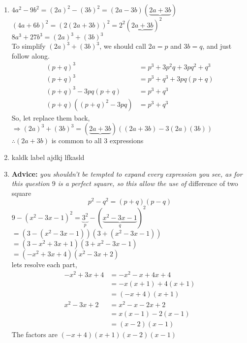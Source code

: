 \begin{multicols}{2}
\begin{enumerate}[label={\textbf{\arabic*.}}]
    \item 
        $4a^2 - 9b^2 = (2a)^2 - (3b)^2  = (2a - 3b)(\underbrace{2a+3b})$ \\
        $(4a + 6b)^2  = \left(2(2a + 3b)\right)^2 = 2^2 (\underbrace{2a + 3b})^2$ \\
        $8a^3 + 27b^3  = (2a)^3 + (3b)^3$ \\
        To simplify $(2a)^3 + (3b)^3$, we should call $2a = p $
        and $3b = q$, and just follow along. 
        \begin{align*} 
            (p + q)^3 &= p^3 + 3p^2q + 3pq^2 + q^3 \\
            (p + q)^3 &= p^3 + q^3 + 3pq(p + q)  \\
            (p + q)^3 - 3pq(p + q) & = p^3 + q^3 \\
            (p+q)((p+q)^2 - 3pq) &= p^3 + q^3
        \end{align*}
        So, let replace them back, \\
        $ \Rightarrow (2a)^3 + (3b)^3 =(\underbrace{2a + 3b})\left((2a + 3b) - 3(2a)(3b)\right) $ \\
        $\therefore (2a + 3b)$ is common to all 3 expressions
    \item kaldk label
    ajdkj lfkasld 

    \item \textbf{Advice:} \textit{you shouldn't be tempted to expand every expression you see, as for this question $9$ is a perfect square, so this allow the use of }difference of two square \\
    $$\boxed{p^2 - q^2 = (p+q)(p-q)}$$ 
        $9 - (x^2 - 3x - 1)^2 = \underbrace{3^2}_{p} - (\underbrace{x^2 - 3x -1}_{q})^2$  \\
        $= (3 - (x^2 - 3x  - 1) )(3 + (x^2 - 3x  - 1) )$ \\
        $= (3 - x^2 + 3x  + 1 )(3 + x^2 - 3x  - 1 )$ \\
        $= (- x^2 + 3x  + 4 )(x^2 - 3x  + 2 )$ \\
    lets resolve each part, \vspace{-10pt}
    \begin{align*}
    -x^2 + 3x + 4 &= -x^2 -x + 4x + 4 \\
    & = -x(x + 1) + 4(x + 1) \\
    & = (-x + 4)(x+1)\\
    x^2 - 3x + 2 &= x^2 - x -2x + 2 \\
    & = x(x-1) -2 (x -1) \\
    & = (x-2)(x-1)
    \end{align*} 
    The factors are  $(-x + 4)(x+1)(x-2)(x-1)$


\end{enumerate}
\end{multicols}

